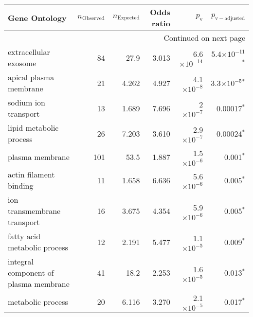 \begin{longtable}{|l|r|r|r|r|r|}
\toprule
                                     Gene Ontology & $n_{\mathrm{Observed}}$ & $n_{\mathrm{Expected}}$ & Odds ratio &     $p_{\mathrm{v}}$ &      $p_{\mathrm{v-adjusted}}$ \\
\midrule
\endhead
\midrule
\multicolumn{6}{r}{{Continued on next page}} \\
\midrule
\endfoot

\bottomrule
\endlastfoot
                             extracellular exosome &                      84 &                    27.9 &      3.013 & 6.6$\times 10^{-14}$ &  5.4$\times 10^{-11}$$\bm{^*}$ \\
                            apical plasma membrane &                      21 &                   4.262 &      4.927 &  4.1$\times 10^{-8}$ &   3.3$\times 10^{-5}$$\bm{^*}$ \\
                              sodium ion transport &                      13 &                   1.689 &      7.696 &    2$\times 10^{-7}$ &               0.00017$\bm{^*}$ \\
                           lipid metabolic process &                      26 &                   7.203 &      3.610 &  2.9$\times 10^{-7}$ &               0.00024$\bm{^*}$ \\
                                   plasma membrane &                     101 &                    53.5 &      1.887 &  1.5$\times 10^{-6}$ &                 0.001$\bm{^*}$ \\
                            actin filament binding &                      11 &                   1.658 &      6.636 &  5.6$\times 10^{-6}$ &                 0.005$\bm{^*}$ \\
                       ion transmembrane transport &                      16 &                   3.675 &      4.354 &  5.9$\times 10^{-6}$ &                 0.005$\bm{^*}$ \\
                      fatty acid metabolic process &                      12 &                   2.191 &      5.477 &  1.1$\times 10^{-5}$ &                 0.009$\bm{^*}$ \\
             integral component of plasma membrane &                      41 &                    18.2 &      2.253 &  1.6$\times 10^{-5}$ &                 0.013$\bm{^*}$ \\
                                 metabolic process &                      20 &                   6.116 &      3.270 &  2.1$\times 10^{-5}$ &                 0.017$\bm{^*}$ \\

\end{longtable}
